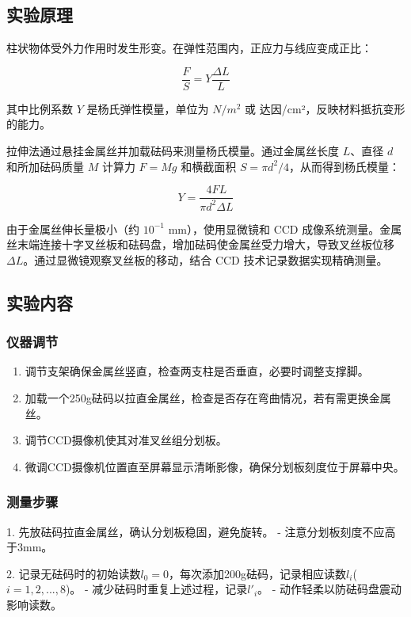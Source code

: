 \documentclass[zihao=5, UTF8]{article}
\theoremstyle{MyLineTheoremStyle} %
\theoremstyle{MyBlockTheoremStyle} %
\theoremstyle{MySubsubsectionStyle} %
\begin{document}
\subsection{实验原理}

柱状物体受外力作用时发生形变。在弹性范围内，正应力与线应变成正比：

\[
\frac{F}{S} = Y \frac{\Delta L}{L}
\]

其中比例系数 $Y$ 是杨氏弹性模量，单位为 $N/m^2$ 或 达因/cm²，反映材料抵抗变形的能力。

拉伸法通过悬挂金属丝并加载砝码来测量杨氏模量。通过金属丝长度 $L$、直径 $d$ 和所加砝码质量 $M$ 计算力 $F=Mg$ 和横截面积 $S=\pi d^2/4$，从而得到杨氏模量：

\[ Y = \frac{4FL}{\pi d^2 \Delta L} \]

由于金属丝伸长量极小（约 $10^{-1}$ mm），使用显微镜和 CCD 成像系统测量。金属丝末端连接十字叉丝板和砝码盘，增加砝码使金属丝受力增大，导致叉丝板位移 $\Delta L$。通过显微镜观察叉丝板的移动，结合 CCD 技术记录数据实现精确测量。


\subsection{实验内容}

\subsubsection*{仪器调节}

\begin{enumerate}
    \item 调节支架确保金属丝竖直，检查两支柱是否垂直，必要时调整支撑脚。
    \item 加载一个250g砝码以拉直金属丝，检查是否存在弯曲情况，若有需更换金属丝。
    \item 调节CCD摄像机使其对准叉丝组分划板。
    \item 微调CCD摄像机位置直至屏幕显示清晰影像，确保分划板刻度位于屏幕中央。
\end{enumerate}

\subsubsection*{测量步骤}

1. 先放砝码拉直金属丝，确认分划板稳固，避免旋转。
   - 注意分划板刻度不应高于3mm。
   
2. 记录无砝码时的初始读数$l_0=0$，每次添加200g砝码，记录相应读数$l_i$($i=1,2,...,8$)。
   - 减少砝码时重复上述过程，记录$l'_i$。
   - 动作轻柔以防砝码盘震动影响读数。
\end{document}
